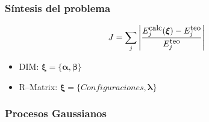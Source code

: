 \documentclass[14pt,compress]{beamer}
\begin{document}
\begin{frame}
\frametitle{Síntesis del problema}

\begin{equation*}
 J = \sum_j \left|\frac{E_j^{\mbox{\small calc}}(\boldsymbol{\xi}) 
- E_j^{\mbox{\small teo}}}{E_j^{\mbox{\small teo}}} \right|
\end{equation*}

\bigskip
\begin{itemize}
\item DIM: $\boldsymbol{\xi}=\{\boldsymbol{\alpha},\boldsymbol{\beta} \}$
\item R--Matrix: $\boldsymbol{\xi}=\{ Configuraciones,\boldsymbol{\lambda} \}$
\end{itemize}

\end{frame}
\begin{frame}
\frametitle{Procesos Gaussianos}


\end{frame}
\end{document}
